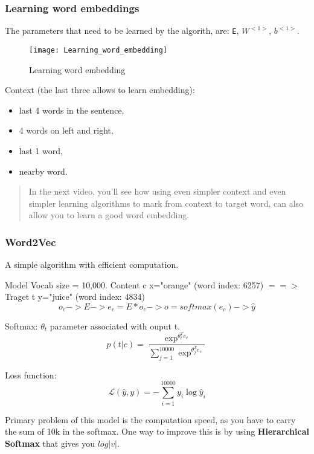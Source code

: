 \subsubsection{Learning word embeddings}
The parameters that need to be learned by the algorith, are: \texttt{E}, $W^{<1>}$, $b^{<1>}$.

\begin{figure}[H]
\centering
\texttt{[image: Learning\_word\_embedding]}
\caption{Learning word embedding}
\end{figure}
Context (the last three allows to learn embedding): 
\begin{itemize}
    \item last 4 words in the sentence,
    \item 4 words on left and right,
    \item last 1 word,
    \item nearby word.
\end{itemize}

\begin{quote}
    In the next video, you'll see how using even simpler context and even simpler learning algorithms to mark from context to target word, can also allow you to learn a good word embedding.
\end{quote}

\subsubsection{Word2Vec}
A simple algorithm with efficient computation.

Model
Vocab size = 10,000.
Content c x="orange" (word index: 6257) $==>$ Traget t y="juice" (word index: 4834)
\begin{equation*}
o_c -> E -> e_c = E*o_c -> o = softmax(e_c) -> \hat{y}
\end{equation*}

Softmax:
$\theta_t$ parameter associated with ouput t.
\begin{equation*}
  p(t | c) = \frac{\exp^{\theta^T_t e_c}}{\sum^{10000}_{j=1} \exp^{\theta^T_j e_c}}
\end{equation*}

Loss function:
\begin{equation*}
  \mathcal{L}(\hat{y}, y) = - \sum^{10000}_{i=1} y_i \log \hat{y}_i
\end{equation*}

Primary problem of this model is the computation speed, as you have to carry the sum of 10k in the softmax. One way to improve this is by using \textbf{Hierarchical Softmax} that gives you $log |v|$.

